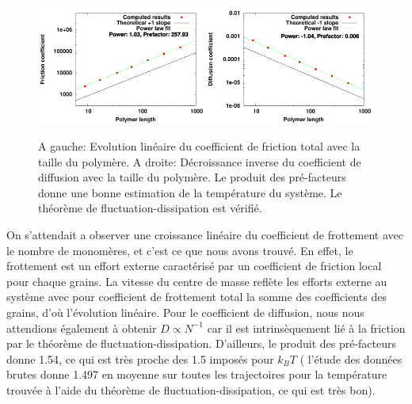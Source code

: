 \documentclass[a4paper,11pt]{article}
\begin{document}
\begin{figure}[H]
\begin{center}
\includegraphics[width=0.5\textwidth]{penteforce.pdf}\includegraphics[width=0.5\textwidth]{diffusioncoefficient.pdf}

\caption{A gauche: Evolution linéaire du coefficient de friction total avec la taille du polymère. A droite: Décroissance inverse du coefficient de diffusion avec la taille du polymère. Le produit des pré-facteurs donne une bonne estimation de la température du système. Le théorème de fluctuation-dissipation est vérifié. }
\label{fluctu-dissip}
\end{center}
\end{figure}

On s'attendait a observer une croissance linéaire du coefficient de frottement avec le nombre de monomères, et c'est ce que nous avons trouvé. En effet, le frottement est un effort externe caractérisé par un coefficient de friction local pour chaque grains. La vitesse du centre de masse reflète les efforts externe au système avec pour coefficient de frottement total la somme des coefficients des grains, d'où l'évolution linéaire. Pour le coefficient de diffusion, nous nous attendions également à obtenir $D \propto N^{-1}$ car il est intrinsèquement lié à la friction par le théorème de fluctuation-dissipation. D'ailleurs, le produit des pré-facteurs donne 1.54, ce qui est très proche des 1.5 imposés pour $k_BT$ ( l'étude des données brutes donne 1.497 en moyenne sur toutes les trajectoires pour la température trouvée à l'aide du théorème de fluctuation-dissipation, ce qui est très bon).
\end{document}
